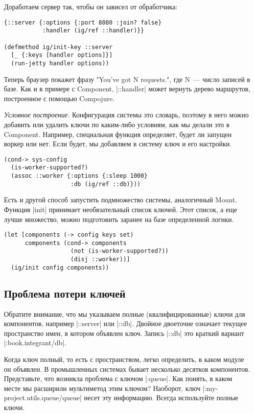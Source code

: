Доработаем сервер так, чтобы он зависел от обработчика:

\begin{verbatim}
{::server {:options {:port 8080 :join? false}
           :handler (ig/ref ::handler)}}

(defmethod ig/init-key ::server
  [_ {:keys [handler options]}]
  (run-jetty handler options))
\end{verbatim}

Теперь браузер покажет фразу "You've got N requests.", где N~--- число записей в
базе. Как и в примере с Component, \spverb|::handler| может вернуть дерево маршрутов,
построенное с помощью Compojure.

\emph{Условное построение.} Конфигурация системы это словарь, поэтому в него можно
добавить или удалить ключи по каким-либо условиям, как мы делали это в
Component. Например, специальная функция определяет, будет ли запущен воркер или
нет. Если будет, мы добавляем в систему ключ и его настройки.

\begin{verbatim}
(cond-> sys-config
  (is-worker-supported?)
  (assoc ::worker {:options {:sleep 1000}
                   :db (ig/ref ::db)}))
\end{verbatim}

Есть и другой способ запустить подмножество системы, аналогичный Mount. Функция
\spverb|init| принимает необязательный список ключей. Этот список, а еще лучше
множество, можно подготовить заранее на базе определенной логики.

\begin{verbatim}
(let [components (-> config keys set)
      components (cond-> components
                   (not (is-worker-supported?))
                   (disj ::worker))]
  (ig/init config components))
\end{verbatim}

\subsection{Проблема потери ключей}

Обратите внимание, что мы указываем полные (квалифицированные) ключи для
компонентов, например \spverb|::server| или \spverb|::db|. Двойное двоеточие означает текущее
пространство имен, в котором объявлен ключ. Запись \spverb|::db| это краткий вариант
\spverb|:book.integrant/db|.

Когда ключ полный, то есть с пространством, легко определить, в каком модуле он
объявлен. В промышленных системах бывает несколько десятков
компонентов. Представьте, что возникла проблема с ключом \spverb|:queue|. Как понять, в
каком месте мы расширили мультиметод этим ключом? Наоборот, ключ
\spverb|:my-project.utils.queue/queue| несет эту информацию. Всегда используйте полные
ключи.

